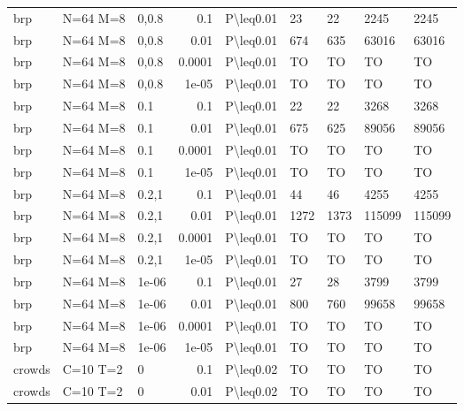 \begin{longtable}{lllrlllll}
 brp           & N=64 M=8  & 0,0.8 & 0.1    & P\textbackslash{}leq0.01  & 23   & 22   & 2245     & 2245    \\
 brp           & N=64 M=8  & 0,0.8 & 0.01   & P\textbackslash{}leq0.01  & 674  & 635  & 63016    & 63016   \\
 brp           & N=64 M=8  & 0,0.8 & 0.0001 & P\textbackslash{}leq0.01  & TO   & TO   & TO       & TO      \\
 brp           & N=64 M=8  & 0,0.8 & 1e-05  & P\textbackslash{}leq0.01  & TO   & TO   & TO       & TO      \\
 brp           & N=64 M=8  & 0.1   & 0.1    & P\textbackslash{}leq0.01  & 22   & 22   & 3268     & 3268    \\
 brp           & N=64 M=8  & 0.1   & 0.01   & P\textbackslash{}leq0.01  & 675  & 625  & 89056    & 89056   \\
 brp           & N=64 M=8  & 0.1   & 0.0001 & P\textbackslash{}leq0.01  & TO   & TO   & TO       & TO      \\
 brp           & N=64 M=8  & 0.1   & 1e-05  & P\textbackslash{}leq0.01  & TO   & TO   & TO       & TO      \\
 brp           & N=64 M=8  & 0.2,1 & 0.1    & P\textbackslash{}leq0.01  & 44   & 46   & 4255     & 4255    \\
 brp           & N=64 M=8  & 0.2,1 & 0.01   & P\textbackslash{}leq0.01  & 1272 & 1373 & 115099   & 115099  \\
 brp           & N=64 M=8  & 0.2,1 & 0.0001 & P\textbackslash{}leq0.01  & TO   & TO   & TO       & TO      \\
 brp           & N=64 M=8  & 0.2,1 & 1e-05  & P\textbackslash{}leq0.01  & TO   & TO   & TO       & TO      \\
 brp           & N=64 M=8  & 1e-06 & 0.1    & P\textbackslash{}leq0.01  & 27   & 28   & 3799     & 3799    \\
 brp           & N=64 M=8  & 1e-06 & 0.01   & P\textbackslash{}leq0.01  & 800  & 760  & 99658    & 99658   \\
 brp           & N=64 M=8  & 1e-06 & 0.0001 & P\textbackslash{}leq0.01  & TO   & TO   & TO       & TO      \\
 brp           & N=64 M=8  & 1e-06 & 1e-05  & P\textbackslash{}leq0.01  & TO   & TO   & TO       & TO      \\
 crowds        & C=10 T=2  & 0     & 0.1    & P\textbackslash{}leq0.02  & TO   & TO   & TO       & TO      \\
 crowds        & C=10 T=2  & 0     & 0.01   & P\textbackslash{}leq0.02  & TO   & TO   & TO       & TO      \\

\end{longtable}
